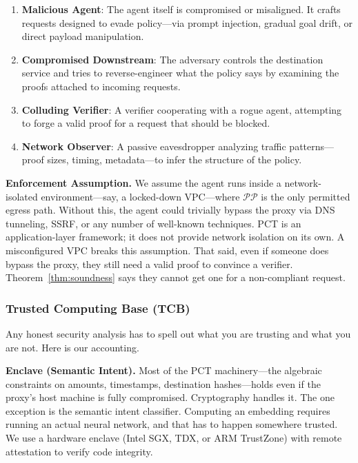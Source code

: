 \documentclass[10pt,conference]{IEEEtran}
\begin{document}
\begin{enumerate}
    \item \textbf{Malicious Agent}: The agent itself is compromised or misaligned. It crafts requests designed to evade policy---via prompt injection, gradual goal drift, or direct payload manipulation.
    \item \textbf{Compromised Downstream}: The adversary controls the destination service and tries to reverse-engineer what the policy says by examining the proofs attached to incoming requests.
    \item \textbf{Colluding Verifier}: A verifier cooperating with a rogue agent, attempting to forge a valid proof for a request that should be blocked.
    \item \textbf{Network Observer}: A passive eavesdropper analyzing traffic patterns---proof sizes, timing, metadata---to infer the structure of the policy.
\end{enumerate}

\textbf{Enforcement Assumption.} We assume the agent runs inside a network-isolated environment---say, a locked-down VPC---where $\mathcal{PP}$ is the only permitted egress path. Without this, the agent could trivially bypass the proxy via DNS tunneling, SSRF, or any number of well-known techniques. PCT is an application-layer framework; it does not provide network isolation on its own. A misconfigured VPC breaks this assumption. That said, even if someone does bypass the proxy, they still need a valid proof to convince a verifier. Theorem~\ref{thm:soundness} says they cannot get one for a non-compliant request.

\subsubsection{Trusted Computing Base (TCB)}

Any honest security analysis has to spell out what you are trusting and what you are not. Here is our accounting.

\textbf{Enclave (Semantic Intent).} Most of the PCT machinery---the algebraic constraints on amounts, timestamps, destination hashes---holds even if the proxy's host machine is fully compromised. Cryptography handles it. The one exception is the semantic intent classifier. Computing an embedding requires running an actual neural network, and that has to happen somewhere trusted. We use a hardware enclave (Intel SGX, TDX, or ARM TrustZone) with remote attestation to verify code integrity.
\end{document}
